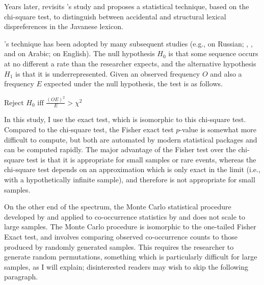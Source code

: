 \citet{McCarthy1988}

Years later, \citet{Mester1988} revisits \citeauthor{Uhlenbeck1950}'s study and proposes a statistical technique, based on the chi-square test, to distinguish between accidental and structural lexical dispreferences in the Javanese lexicon. 

\citeauthor{Mester1988}'s technique has been adopted by many subsequent studies (e.g., \citealt{Padgett1992,Padgett1995} on Russian; \citealt{Pierrehumbert1993}, \citealt{Frisch1996}, and \citealt{Frisch2004} on Arabic; \citealt{Berkley1994b,Berkley1994a,Berkley2000} on English).
The null hypothesis $H_0$ is that some sequence occurs at no different a rate than the researcher expects, and the alternative hypothesis $H_1$ is that it is underrepresented. Given an observed frequency $O$ and also a frequency $E$ expected under the null hypothesis, the test is as follows.

\begin{example}
$\displaystyle \textrm{Reject } H_0 \textrm{ iff } \frac{(O E) ^ 2}{E} >
χ^2$
\end{example}

  
In this study, I use the \citet{Fisher1934} exact test, which is isomorphic to this chi-square test. Compared to the chi-square test, the Fisher exact test $p$-value is somewhat more difficult to compute, but both are automated by modern statistical packages and can be computed rapidly. The major advantage of the Fisher test over the chi-square test is that it is appropriate for small samples or rare events, whereas the chi-square test depends on an approximation which is only exact in the limit (i.e., with a hypothetically infinite sample), and therefore is not appropriate for small samples.

On the other end of the spectrum, the Monte Carlo statistical procedure developed by \citet{Kessler2001} and applied to co-occurrence statistics by \citet{Martin2007,Martin2011} and \citet{Brown2010} does not scale to large samples. The Monte Carlo procedure is isomorphic to the one-tailed Fisher Exact test, and involves comparing observed co-occurrence counts to those produced by randomly generated samples.  This requires the researcher to generate random permutations, something which is particularly difficult for large samples, as I will explain; disinterested readers may wish to skip the following paragraph.

